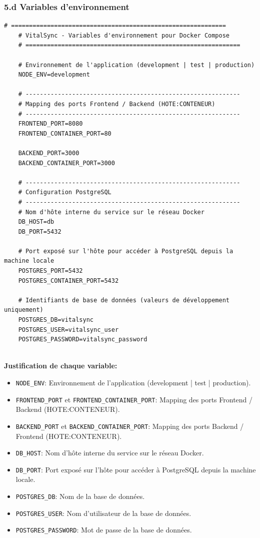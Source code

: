 \documentclass[11pt,a4paper]{article}
\begin{document}
\subsubsection*{5.d Variables d'environnement}
\begin{lstlisting}[language={},title=.env.example]
    # ============================================================
    # VitalSync - Variables d'environnement pour Docker Compose
    # ============================================================
    
    # Environnement de l'application (development | test | production)
    NODE_ENV=development
    
    # ------------------------------------------------------------
    # Mapping des ports Frontend / Backend (HOTE:CONTENEUR)
    # ------------------------------------------------------------
    FRONTEND_PORT=8080
    FRONTEND_CONTAINER_PORT=80
    
    BACKEND_PORT=3000
    BACKEND_CONTAINER_PORT=3000
    
    # ------------------------------------------------------------
    # Configuration PostgreSQL
    # ------------------------------------------------------------
    # Nom d'hôte interne du service sur le réseau Docker
    DB_HOST=db
    DB_PORT=5432
    
    # Port exposé sur l'hôte pour accéder à PostgreSQL depuis la machine locale
    POSTGRES_PORT=5432
    POSTGRES_CONTAINER_PORT=5432
    
    # Identifiants de base de données (valeurs de développement uniquement)
    POSTGRES_DB=vitalsync
    POSTGRES_USER=vitalsync_user
    POSTGRES_PASSWORD=vitalsync_password
    
\end{lstlisting}

\noindent\textbf{Justification de chaque variable:}
\begin{itemize}
    \item \texttt{NODE\_ENV}: Environnement de l'application (development | test | production).
    \item \texttt{FRONTEND\_PORT} et \texttt{FRONTEND\_CONTAINER\_PORT}: Mapping des ports Frontend / Backend (HOTE:CONTENEUR).
    \item \texttt{BACKEND\_PORT} et \texttt{BACKEND\_CONTAINER\_PORT}: Mapping des ports Backend / Frontend (HOTE:CONTENEUR).
    \item \texttt{DB\_HOST}: Nom d'hôte interne du service sur le réseau Docker.
    \item \texttt{DB\_PORT}: Port exposé sur l'hôte pour accéder à PostgreSQL depuis la machine locale.
    \item \texttt{POSTGRES\_DB}: Nom de la base de données.
    \item \texttt{POSTGRES\_USER}: Nom d'utilisateur de la base de données.
    \item \texttt{POSTGRES\_PASSWORD}: Mot de passe de la base de données.
\end{itemize}
\end{document}
